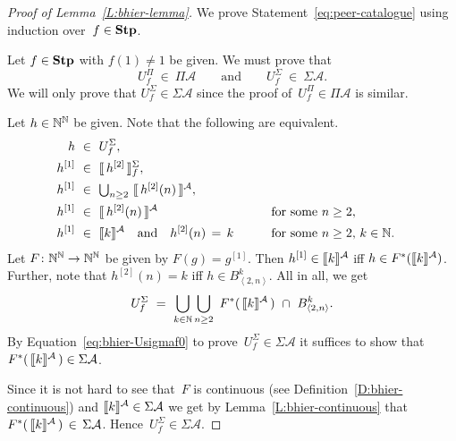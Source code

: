 \begin{proof}[Proof of Lemma~\ref{L:bhier-lemma}]
We prove Statement~\eqref{eq:peer-catalogue} using induction 
over~$f\in\mathbf{Stp}$.

\vspace{.6em}
\noindent
Let $f\in\mathbf{Stp}$ with $f(1)\neq1$ be given.
We must prove that
\begin{equation*}
U^\Pi_f \ \in\ \Pi \mathcal{A}
\qquad\text{and}\qquad
U^\Sigma_f \ \in\ \Sigma \mathcal{A}.
\end{equation*}
We will only prove that $U^\Sigma_f \in \Sigma \mathcal{A}$
since the proof of~$U^\Pi_f \in \Pi\mathcal{A}$ is similar.

Let $h\in \mathbb{N}^{\mathbb{N}}$ be given.
Note that the following are equivalent.
\begin{alignat*}{3}
h \ &\in\ U^\Sigma_f, \\
h^{[1]} \ &\in\ \decode{\,h^{[2]}\,}^\Sigma_f, \\
h^{[1]} \ &\in\ \textstyle{\bigcup_{n\geq 2}}\ 
           \decode{\,h^{[2]}(n)\,}^\mathcal{A}, \\
h^{[1]} \ &\in\ \decode{\,h^{[2]}(n)\,}^\mathcal{A}
\qquad &&\text{for some~$n\geq 2$},\\
h^{[1]} \ &\in\ \decode{k}^\mathcal{A}
\quad\text{and}\quad
h^{[2]}(n)\,=\,k
\qquad &&\text{for some~$n\geq 2$,\  $k\in\N$}.
\end{alignat*}
Let $F\colon \mathbb{N}^{\mathbb{N}}\rightarrow\mathbb{N}^{\mathbb{N}}$
be given by $F(g)=g^{[1]}$.
Then $h^{[1]} \in \decode{k}^{\mathcal{A}}$
iff $h\in F^*(\decode{k}^\mathcal{A})$.
Further, note that $h^{[2]}(n)=k$ iff $h\in B^{k}_{\left<2,n\right>}$.
All in all, we get 
\begin{equation}
\label{eq:bhier-Usigmaf0}
U^\Sigma_f
\ =\ 
\bigcup_{k\in\N} \bigcup_{n\geq 2}
\ F^*(\,\decode{k}^\mathcal{A}\,) \ \cap\  B^k_{\left<2,n\right>}.
\end{equation}
By Equation~\eqref{eq:bhier-Usigmaf0}
to prove~$U^\Sigma_f \in\Sigma \mathcal{A}$
it suffices to show 
that~$F^*(\,\decode{k}^\mathcal{A}\,) \in \Sigma\mathcal{A}$.

Since it is not hard to see that~$F$ is continuous
(see Definition~\ref{D:bhier-continuous})
and $\decode{k}^\mathcal{A} \in \Sigma\mathcal{A}$
we get by Lemma~\ref{L:bhier-continuous} that
$F^*(\,\decode{k}^\mathcal{A}\,) \,\in\, \Sigma\mathcal{A}$.
Hence~$U^\Sigma_f \in \Sigma\mathcal{A}$.


\end{proof}
